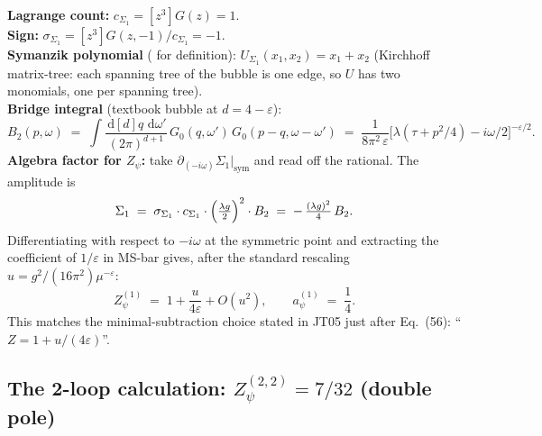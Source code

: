\documentclass[11pt,a4paper]{article}
\renewcommand{\dd}[1]{\,\mathrm{d}#1}
\theoremstyle{definition}
\theoremstyle{plain}
\begin{document}
\begin{cfacbox}
\begin{center}
\end{center}
\textbf{Lagrange count:} $c_{\Sigma_1} = [z^3]G(z) = 1$.\\
\textbf{Sign:} $\sigma_{\Sigma_1} = [z^3]G(z,-1) / c_{\Sigma_1} = -1$.\\
\textbf{Symanzik polynomial} ( for definition):
$U_{\Sigma_1}(x_1, x_2) = x_1 + x_2$
(Kirchhoff matrix-tree: each spanning tree of the bubble is one edge,
so $U$ has two monomials, one per spanning tree).\\
\textbf{Bridge integral} (textbook bubble at $d = 4 - \varepsilon$):
\[
  B_2(p, \omega) \;=\; \int\!\frac{\dd[d]{q}\,\dd\omega'}{(2\pi)^{d+1}}
   \,G_0(q, \omega')\,G_0(p-q, \omega - \omega')
   \;=\; \frac{1}{8\pi^2\,\varepsilon}\bigl[\lambda(\tau + p^2/4) - i\omega/2\bigr]^{-\varepsilon/2}.
\]
\textbf{Algebra factor for $Z_\psi$:} take $\partial_{(-i\omega)}
\Sigma_1\big|_{\mathrm{sym}}$ and read off the rational. The
amplitude is
\[
  \Sigma_1 \;=\; \sigma_{\Sigma_1}\cdot c_{\Sigma_1}\cdot
                  \Bigl(\tfrac{\lambda g}{2}\Bigr)^2 \cdot B_2
            \;=\; -\,\tfrac{(\lambda g)^2}{4}\,B_2.
\]
Differentiating with respect to $-i\omega$ at the symmetric point and
extracting the coefficient of $1/\varepsilon$ in MS-bar gives, after
the standard rescaling $u = g^2/(16\pi^2)\mu^{-\varepsilon}$:
\[
  Z_\psi^{(1)} \;=\; 1 + \frac{u}{4\varepsilon} + O(u^2),
  \qquad a_\psi^{(1)} \;=\; \frac{1}{4}.
\]
This matches the minimal-subtraction choice stated in JT05 just
after Eq.~(56): ``$Z = 1 + u/(4\varepsilon)$''.
\end{cfacbox}

\subsection{The 2-loop calculation: $Z_\psi^{(2,2)} = 7/32$ (double pole)}
\label{app:2loop-double}
\end{document}

